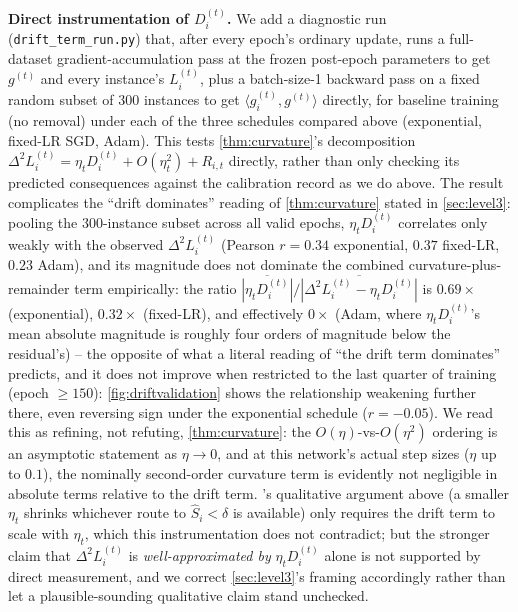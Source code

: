 \documentclass{article}
\theoremstyle{plain}
\theoremstyle{definition}
\theoremstyle{remark}
\begin{document}
\textbf{Direct instrumentation of $D_i^{(t)}$.} We add a diagnostic run (\texttt{drift\_term\_run.py}) that, after every epoch's ordinary update, runs a full-dataset gradient-accumulation pass at the frozen post-epoch parameters to get $g^{(t)}$ and every instance's $L_i^{(t)}$, plus a batch-size-1 backward pass on a fixed random subset of 300 instances to get $\langle g_i^{(t)},g^{(t)}\rangle$ directly, for baseline training (no removal) under each of the three schedules compared above (exponential, fixed-LR SGD, Adam). This tests \cref{thm:curvature}'s decomposition $\Delta^2 L_i^{(t)} = \eta_t D_i^{(t)} + O(\eta_t^2) + R_{i,t}$ directly, rather than only checking its predicted consequences against the calibration record as we do above. The result complicates the ``drift dominates'' reading of \cref{thm:curvature} stated in \cref{sec:level3}: pooling the 300-instance subset across all valid epochs, $\eta_tD_i^{(t)}$ correlates only weakly with the observed $\Delta^2L_i^{(t)}$ (Pearson $r=0.34$ exponential, $0.37$ fixed-LR, $0.23$ Adam), and its magnitude does not dominate the combined curvature-plus-remainder term empirically: the ratio $\overline{|\eta_tD_i^{(t)}|}/\overline{|\Delta^2L_i^{(t)}-\eta_tD_i^{(t)}|}$ is $0.69\times$ (exponential), $0.32\times$ (fixed-LR), and effectively $0\times$ (Adam, where $\eta_tD_i^{(t)}$'s mean absolute magnitude is roughly four orders of magnitude below the residual's) -- the opposite of what a literal reading of ``the drift term dominates'' predicts, and it does not improve when restricted to the last quarter of training (epoch $\ge150$): \cref{fig:driftvalidation} shows the relationship weakening further there, even reversing sign under the exponential schedule ($r=-0.05$). We read this as refining, not refuting, \cref{thm:curvature}: the $O(\eta)$-vs-$O(\eta^2)$ ordering is an asymptotic statement as $\eta\to0$, and at this network's actual step sizes ($\eta$ up to $0.1$), the nominally second-order curvature term is evidently not negligible in absolute terms relative to the drift term. 's qualitative argument above (a smaller $\eta_t$ shrinks whichever route to $\hat S_i<\delta$ is available) only requires the drift term to scale with $\eta_t$, which this instrumentation does not contradict; but the stronger claim that $\Delta^2L_i^{(t)}$ is \emph{well-approximated by} $\eta_tD_i^{(t)}$ alone is not supported by direct measurement, and we correct \cref{sec:level3}'s framing accordingly rather than let a plausible-sounding qualitative claim stand unchecked.
\end{document}
